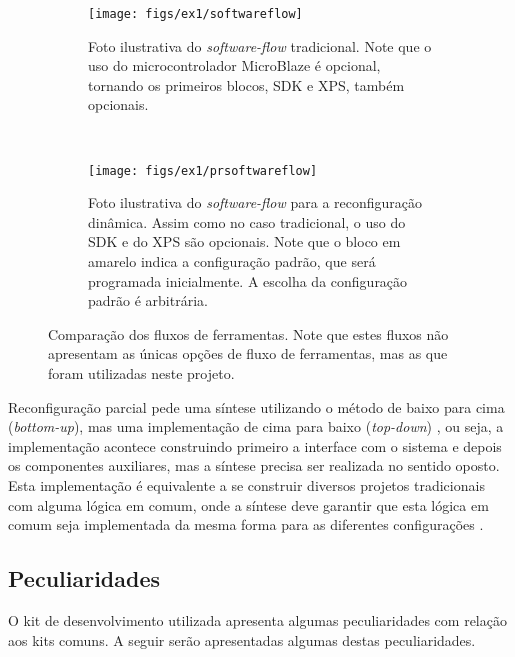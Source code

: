\documentclass[11pt,a4paper,oneside]{book}
\begin{document}
\begin{figure}[h]
	\centering
       	\begin{subfigure}[b]{\textwidth}
       		\centering
		\texttt{[image: figs/ex1/softwareflow]}
		\caption{Foto ilustrativa do \textit{software-flow} tradicional. Note que o uso do microcontrolador MicroBlaze é opcional, tornando os primeiros blocos, SDK e XPS, também opcionais.}
		\label{fig:softwareflow}
	\end{subfigure}\\
	\begin{subfigure}[b]{\textwidth}
		\centering
		\texttt{[image: figs/ex1/prsoftwareflow]}
		\caption{Foto ilustrativa do \textit{software-flow} para a reconfiguração dinâmica. Assim como no caso tradicional, o uso do SDK e do XPS são opcionais. Note que o bloco em amarelo indica a configuração padrão, que será programada inicialmente. A escolha da configuração padrão é arbitrária.}
		\label{fig:prsoftwareflow}
	\end{subfigure}
	\caption{Comparação dos fluxos de ferramentas. Note que estes fluxos não apresentam as únicas opções de fluxo de ferramentas, mas as que foram utilizadas neste projeto.}
	\label{fig:softwareflow:comparacao}
\end{figure}

Reconfiguração parcial pede uma síntese utilizando o método \dlq de baixo para cima\drq{} (\textit{bottom-up}), mas uma implementação \dlq de cima para baixo\drq{} (\textit{top-down}) \cite{ug743}, ou seja, a implementação acontece construindo primeiro a interface com o sistema e depois os componentes auxiliares, mas a síntese precisa ser realizada no sentido oposto.
Esta implementação é equivalente a se construir diversos projetos tradicionais com alguma lógica em comum, onde a síntese deve garantir que esta lógica em comum seja implementada da mesma forma para as diferentes configurações \cite{ug702}.

\subsection{Peculiaridades}
O kit de desenvolvimento utilizada apresenta algumas peculiaridades com relação aos kits comuns.
A seguir serão apresentadas algumas destas peculiaridades.
\end{document}
